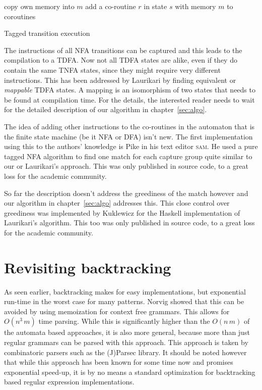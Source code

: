 \documentclass[11pt]{Thesis}
\theoremstyle{definition}
\newcommand{\seclabel}[1]{\label{sec:#1}}
\begin{document}
\begin{algorithm*}
  \begin{algorithmic}
        \State copy own memory into $m$
        \State {}
        \State add a co-routine $r$ in state $s$ with memory $m$ to coroutines
        \State {}
      \EndIf
    \EndFor
  \EndFunction
  \end{algorithmic}
  \caption{\label{alg:coroutine-tagged}Tagged transition execution}
\end{algorithm*}

The instructions of all NFA transitions can be captured and this leads to the 
compilation to a TDFA. Now not all TDFA states are alike, even if they do contain 
the same TNFA states, since they might require very different instructions. 
This has been addressed by Laurikari\cite{Laur00a} by finding equivalent or
\emph{mappable} TDFA states. A mapping is an isomorphism of two states that 
needs to be found at compilation time. For the details, the interested reader 
needs to wait for the detailed description of our algorithm in chapter~\ref{sec:algo}.

The idea of adding other instructions to the co-routines in the automaton 
that is the finite state machine (be it NFA or DFA) isn't new. The first 
implementation using this to the authors' knowledge is Pike\cite{Pike87a} in 
his text editor \textsc{sam}. He used a pure tagged NFA algorithm to find one 
match for each capture group quite similar to our or Laurikari's approach. This
was only published in source code, to a great loss for the academic community.

So far the description doesn't address the greediness of the match however and
our algorithm in chapter~\ref{sec:algo} addresses this. This close control
over greediness was implemented by Kuklewicz\cite{Kukl07a} for the Haskell
implementation of Laurikari's algorithm. This too was only published in source
code, to a great loss for the academic community.

\section{Revisiting backtracking}\seclabel{revise-backtrack}
As seen earlier, backtracking makes for easy implementations, but exponential 
run-time in the worst case for many patterns. Norvig\cite{Norv91a} showed that
this can be avoided by using memoization for context free grammars.  This
allows for $O(n^3\, m)$ time parsing. While this is significantly higher than
the $O(n\, m)$ of the automata based approaches, it is also more general,
because more than just regular grammars can be parsed with this approach.  This
approach is taken by combinatoric parsers such as the (J)Parsec library.  It
should be noted however that while this approach has been known for some time
now and promises exponential speed-up, it is by no means a standard
optimization for backtracking based regular expression implementations.
\end{document}
